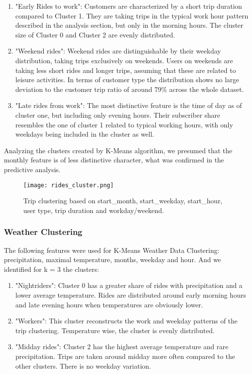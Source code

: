 \begin{enumerate}[start=0]
    \item "Early Rides to work": Customers are characterized by a short trip duration compared to Cluster 1. They are taking trips in the typical
    work hour pattern described in the analysis section, but only in the morning hours. The cluster size of Cluster 0 and Cluster 2 are evenly distributed.
    \item "Weekend rides": Weekend rides are distinguishable by their weekday distribution, taking trips exclusively on weekends. Users on weekends
    are taking less short rides and longer trips, assuming that these are related to leisure activities. In terms of customer type the distribution shows no large deviation to the
    customer trip ratio of around 79\% across the whole dataset.
    \item "Late rides from work": The most distinctive feature is the time of day as of cluster one, but including only evening hours. Their subscriber share resembles
    the one of cluster 1 related to typical working hours, with only weekdays being included in the cluster as well.
\end{enumerate}

Analyzing the clusters created by K-Means algorithm, we presumed that the monthly feature is of less distinctive character, what was confirmed in
the predictive analysis.

\begin{figure}[hbtp]
    \texttt{[image: rides\_cluster.png]}   
    \caption{Trip clustering based on start\_month, start\_weekday, start\_hour, user type, trip duration and workday/weekend.}
\end{figure}

\subsubsection{Weather Clustering}
The following features were used for K-Means Weather Data Clustering: precipitation, maximal temperature, months, weekday and hour. And we identified for k = 3 the clusters:

\begin{enumerate}[start=0]
    \item "Nightriders": Cluster 0 has a greater share of rides with precipitation and a lower average temperature. Rides are distributed around early morning hours and late evening hours when temperatures are obviously lower. 

    \item "Workers": This cluster reconstructs the work and weekday patterns of the trip clustering. Temperature wise, the cluster is evenly distributed.
 
    \item "Midday rides": Cluster 2 has the highest average temperature and rare precipitation. Trips are taken around midday more often compared to the other clusters. There is no weekday variation. 
\end{enumerate}

